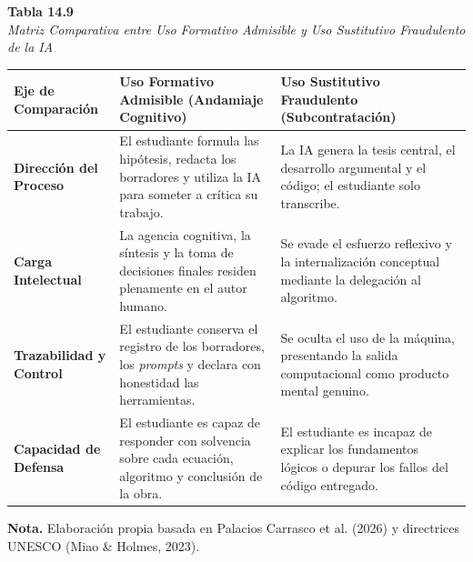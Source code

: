 \begin{table}[htbp]
\centering
\small
\renewcommand{\arraystretch}{1.25}
\textbf{Tabla 14.9}\\[0.15cm]
\textit{Matriz Comparativa entre Uso Formativo Admisible y Uso Sustitutivo Fraudulento de la IA}\\[0.25cm]
\begin{tabularx}{\textwidth}{p{3.2cm}X X}
\toprule
\textbf{Eje de Comparación} & \textbf{Uso Formativo Admisible (Andamiaje Cognitivo)} & \textbf{Uso Sustitutivo Fraudulento (Subcontratación)} \\
\midrule
\textbf{Dirección del Proceso} & El estudiante formula las hipótesis, redacta los borradores y utiliza la IA para someter a crítica su trabajo. & La IA genera la tesis central, el desarrollo argumental y el código; el estudiante solo transcribe. \\
\textbf{Carga Intelectual} & La agencia cognitiva, la síntesis y la toma de decisiones finales residen plenamente en el autor humano. & Se evade el esfuerzo reflexivo y la internalización conceptual mediante la delegación al algoritmo. \\
\textbf{Trazabilidad y Control} & El estudiante conserva el registro de los borradores, los \textit{prompts} y declara con honestidad las herramientas. & Se oculta el uso de la máquina, presentando la salida computacional como producto mental genuino. \\
\textbf{Capacidad de Defensa} & El estudiante es capaz de responder con solvencia sobre cada ecuación, algoritmo y conclusión de la obra. & El estudiante es incapaz de explicar los fundamentos lógicos o depurar los fallos del código entregado. \\
\bottomrule
\end{tabularx}
\vspace{0.15cm}
\raggedright \scriptsize \textbf{Nota.} Elaboración propia basada en Palacios Carrasco et al. (2026) y directrices UNESCO (Miao \& Holmes, 2023).
\end{table}

